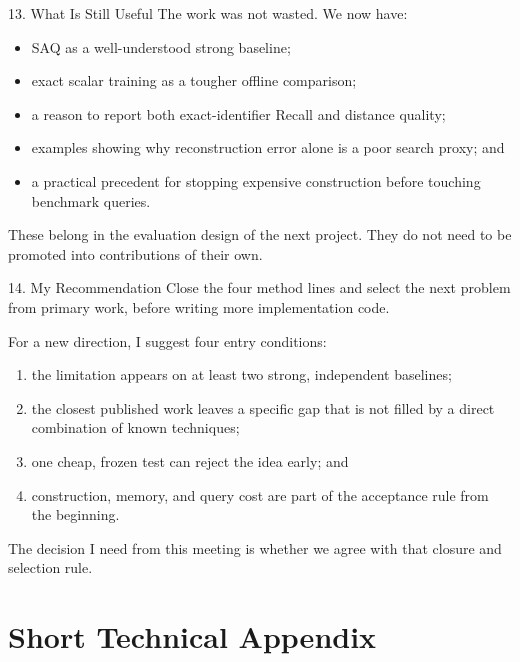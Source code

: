 \documentclass[
  ignorenonframetext,
  aspectratio=169,
]{beamer}
\providecommand{\tightlist}{%
  \setlength{\itemsep}{0pt}\setlength{\parskip}{0pt}}
\begin{document}
\begin{frame}{13. What Is Still Useful}
\protect{}\label{13-what-is-still-useful}
The work was not wasted. We now have:

\begin{itemize}
\tightlist
\item
  SAQ as a well-understood strong baseline;
\item
  exact scalar training as a tougher offline comparison;
\item
  a reason to report both exact-identifier Recall and distance quality;
\item
  examples showing why reconstruction error alone is a poor search
  proxy; and
\item
  a practical precedent for stopping expensive construction before
  touching benchmark queries.
\end{itemize}

These belong in the evaluation design of the next project. They do not
need to be promoted into contributions of their own.
\end{frame}

\begin{frame}{14. My Recommendation}
\protect{}\label{14-my-recommendation}
Close the four method lines and select the next problem from primary
work, before writing more implementation code.

For a new direction, I suggest four entry conditions:

\begin{enumerate}
\tightlist
\item
  the limitation appears on at least two strong, independent baselines;
\item
  the closest published work leaves a specific gap that is not filled by
  a direct combination of known techniques;
\item
  one cheap, frozen test can reject the idea early; and
\item
  construction, memory, and query cost are part of the acceptance rule
  from the beginning.
\end{enumerate}

The decision I need from this meeting is whether we agree with that
closure and selection rule.
\end{frame}

\section{Short Technical Appendix}\label{short-technical-appendix}
\end{document}
